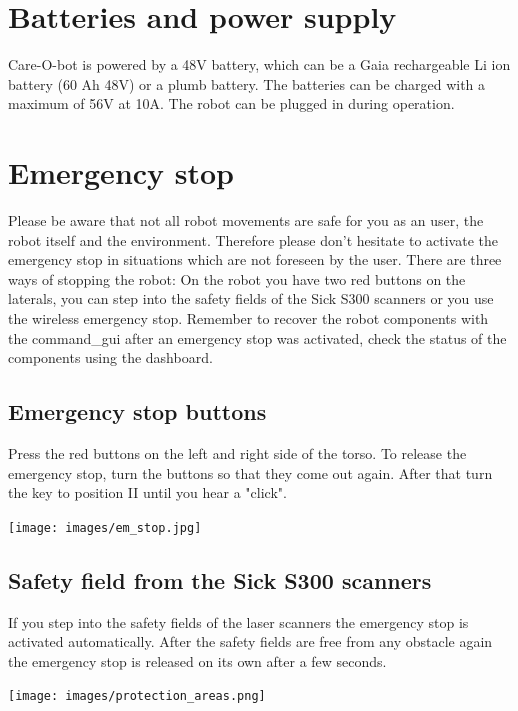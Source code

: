\section{Batteries and power supply}
Care-O-bot is powered by a 48V battery, which can be a Gaia rechargeable Li ion battery (60 Ah 48V) or a plumb battery. The batteries can be charged with a maximum of 56V at 10A. The robot can be plugged in during operation.

\section{Emergency stop}\label{sec:emergency_stop}
Please be aware that not all robot movements are safe for you as an user, the robot itself and the environment. Therefore please don't hesitate to activate the emergency stop in situations which are not foreseen by the user. There are three ways of stopping the robot: On the robot you have two red buttons on the laterals, you can step into the safety fields of the Sick S300 scanners or you use the wireless emergency stop. Remember to recover the robot components with the command\_gui after an emergency stop was activated, check the status of the components using the dashboard.

\subsection{Emergency stop buttons}
Press the red buttons on the left and right side of the torso. To release the emergency stop, turn the buttons so that they come out again. After that turn the key to position II until you hear a "click".

\begin{center}
\texttt{[image: images/em\_stop.jpg]}
\end{center}

\subsection{Safety field from the Sick S300 scanners}
If you step into the safety fields of the laser scanners the emergency stop is activated automatically. After the safety fields are free from any obstacle again the emergency stop is released on its own after a few seconds.

\begin{center}
\texttt{[image: images/protection\_areas.png]}
\end{center}

